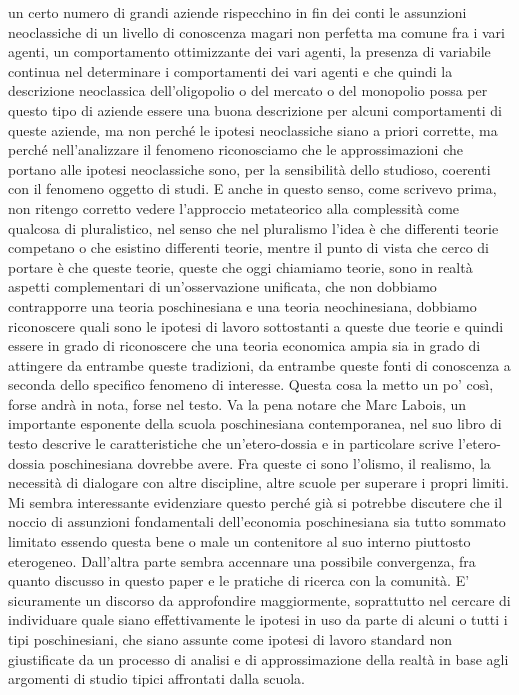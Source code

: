 \documentclass[a4paper, headings=standardclasses]{scrartcl}
\begin{document}
un certo numero di grandi aziende rispecchino in fin dei conti le assunzioni neoclassiche di
un livello di conoscenza magari non perfetta ma comune fra i vari agenti, un comportamento
ottimizzante dei vari agenti, la presenza di variabile continua nel determinare i comportamenti
dei vari agenti e che quindi la descrizione neoclassica dell'oligopolio o del mercato o
del monopolio possa per questo tipo di aziende essere una buona descrizione per alcuni comportamenti
di queste aziende, ma non perché le ipotesi neoclassiche siano a priori corrette, ma perché
nell'analizzare il fenomeno riconosciamo che le approssimazioni che portano alle ipotesi
neoclassiche sono, per la sensibilità dello studioso, coerenti con il fenomeno oggetto di studi.
E anche in questo senso, come scrivevo prima, non ritengo corretto vedere l'approccio metateorico
alla complessità come qualcosa di pluralistico, nel senso che nel pluralismo l'idea è che
differenti teorie competano o che esistino differenti teorie, mentre il punto di vista
che cerco di portare è che queste teorie, queste che oggi chiamiamo teorie, sono in
realtà aspetti complementari di un'osservazione unificata, che non dobbiamo contrapporre
una teoria poschinesiana e una teoria neochinesiana, dobbiamo riconoscere quali sono le ipotesi
di lavoro sottostanti a queste due teorie e quindi essere in grado di riconoscere che
una teoria economica ampia sia in grado di attingere da entrambe queste tradizioni,
da entrambe queste fonti di conoscenza a seconda dello specifico fenomeno di interesse.
Questa cosa la metto un po' così, forse andrà in nota, forse nel testo.
Va la pena notare che Marc Labois, un importante esponente della scuola poschinesiana contemporanea,
nel suo libro di testo descrive le caratteristiche che un'etero-dossia e in particolare scrive
l'etero-dossia poschinesiana dovrebbe avere. Fra queste ci sono l'olismo, il realismo,
la necessità di dialogare con altre discipline, altre scuole per superare i propri limiti.
Mi sembra interessante evidenziare questo perché già si potrebbe discutere che il
noccio di assunzioni fondamentali dell'economia poschinesiana sia tutto sommato limitato essendo
questa bene o male un contenitore al suo interno piuttosto eterogeneo.
Dall'altra parte sembra accennare una possibile convergenza,
fra quanto discusso in questo paper e le pratiche di ricerca con la comunità.
E' sicuramente un discorso da approfondire maggiormente, soprattutto nel cercare di
individuare quale siano effettivamente le ipotesi in uso da parte di alcuni o tutti
i tipi poschinesiani, che siano assunte come ipotesi di lavoro standard non giustificate
da un processo di analisi e di approssimazione della realtà in base agli argomenti di studio
tipici affrontati dalla scuola.
\end{document}

